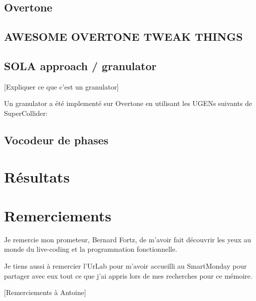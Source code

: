 \documentclass[letterpaper]{article}
\begin{document}
\subsection{Overtone}

\subsection{AWESOME OVERTONE TWEAK THINGS}
\subsection{SOLA approach / granulator}
[Expliquer ce que c'est un granulator]

Un granulator a été implementé sur Overtone en utilisant les UGENs suivants
de SuperCollider:


\subsection{Vocodeur de phases}


\section{Résultats}

\section{Remerciements}
  Je remercie mon prometeur, Bernard Fortz, de m'avoir fait découvrir
  les yeux au monde du live-coding et la programmation fonctionnelle.

  Je tiens aussi à remercier l'UrLab pour m'avoir accueilli au SmartMonday
  pour partager avec eux tout ce que j'ai appris lors de mes recherches
  pour ce mémoire.

  [Remerciements à Antoine]

\footnotesize



\end{document}
